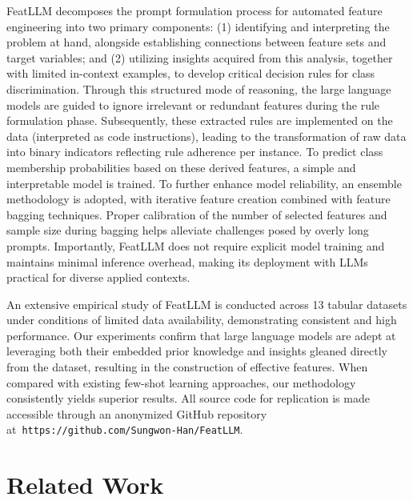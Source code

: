 \textsf{FeatLLM} decomposes the prompt formulation process for automated feature engineering into two primary components: (1) identifying and interpreting the problem at hand, alongside establishing connections between feature sets and target variables; and (2) utilizing insights acquired from this analysis, together with limited in-context examples, to develop critical decision rules for class discrimination. Through this structured mode of reasoning, the large language models are guided to ignore irrelevant or redundant features during the rule formulation phase. Subsequently, these extracted rules are implemented on the data (interpreted as code instructions), leading to the transformation of raw data into binary indicators reflecting rule adherence per instance. To predict class membership probabilities based on these derived features, a simple and interpretable model is trained. To further enhance model reliability, an ensemble methodology is adopted, with iterative feature creation combined with feature bagging techniques. Proper calibration of the number of selected features and sample size during bagging helps alleviate challenges posed by overly long prompts. Importantly, \textsf{FeatLLM} does not require explicit model training and maintains minimal inference overhead, making its deployment with LLMs practical for diverse applied contexts.

An extensive empirical study of \textsf{FeatLLM} is conducted across 13 tabular datasets under conditions of limited data availability, demonstrating consistent and high performance. Our experiments confirm that large language models are adept at leveraging both their embedded prior knowledge and insights gleaned directly from the dataset, resulting in the construction of effective features. When compared with existing few-shot learning approaches, our methodology consistently yields superior results. All source code for replication is made accessible through an anonymized GitHub repository at~\texttt{https://github.com/Sungwon-Han/FeatLLM}.

\section{Related Work}

